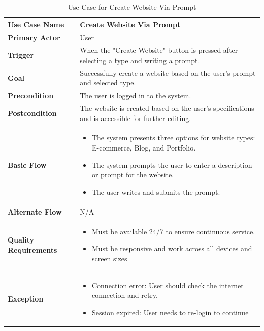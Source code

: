 \documentclass[12pt]{report}
\begin{document}
\clearpage
\vspace{10pt}
\clearpage
\begin{table}[h!]

\begin{tabular}{|p{3.5cm}|p{10cm}|}
\hline
\textbf{Use Case Name} & Create Website Via Prompt \\ 
\hline
\textbf{Primary Actor} & User \\ 
\hline
\textbf{Trigger} & When the "Create Website" button is pressed after selecting a type and writing a prompt. \\ 
\hline
\textbf{Goal} & Successfully create a website based on the user’s prompt and selected type. \\ 
\hline
\textbf{Precondition} & The user is logged in to the system. \\ 
\hline
\textbf{Postcondition} & The website is created based on the user’s specifications and is accessible for further editing. \\ 
\hline

\textbf{Basic Flow} & 
\begin{itemize}
    
    \item The system presents three options for website types: E-commerce, Blog, and Portfolio.
    \item The system prompts the user to enter a description or prompt for the website.
    \item The user writes and submits the prompt.
\end{itemize} \\ 
\hline
\textbf{Alternate Flow} & N/A \\ 
\hline
\textbf{Quality Requirements} & 
\begin{itemize}
    \item Must be available 24/7 to ensure continuous service.
    \item Must be responsive and work across all devices and screen sizes
\end{itemize} \\ 

\textbf{Exception} & 
\begin{itemize}
    \item Connection error: User should check the internet connection and retry.
    \item Session expired: User needs to re-login to continue
\end{itemize} \\ 
\hline
\end{tabular}
\caption{Use Case for Create Website Via Prompt}
\end{table}
\clearpage
\vspace{10pt}
\end{document}

